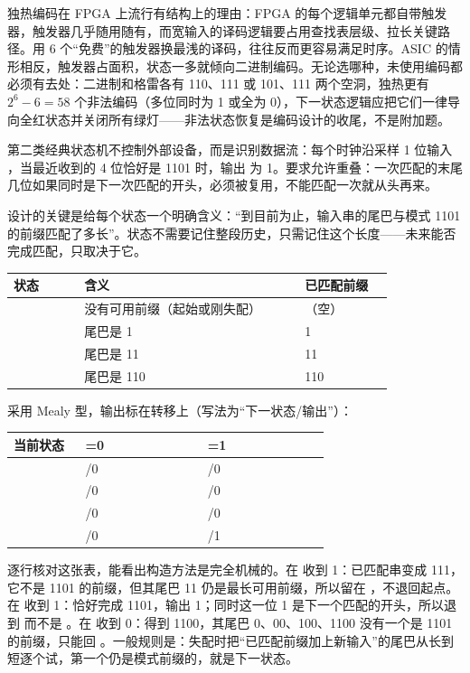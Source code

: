 独热编码在 FPGA 上流行有结构上的理由：FPGA 的每个逻辑单元都自带触发器，触发器几乎随用随有，而宽输入的译码逻辑要占用查找表层级、拉长关键路径。用 6 个“免费”的触发器换最浅的译码，往往反而更容易满足时序。ASIC 的情形相反，触发器占面积，状态一多就倾向二进制编码。无论选哪种，未使用编码都必须有去处：二进制和格雷各有 110、111 或 101、111 两个空洞，独热更有 $2^6-6=58$ 个非法编码（多位同时为 1 或全为 0），下一状态逻辑应把它们一律导向全红状态并关闭所有绿灯——非法状态恢复是编码设计的收尾，不是附加题。


第二类经典状态机不控制外部设备，而是识别数据流：每个时钟沿采样 1 位输入 ，当最近收到的 4 位恰好是 1101 时，输出  为 1。要求允许重叠：一次匹配的末尾几位如果同时是下一次匹配的开头，必须被复用，不能匹配一次就从头再来。

设计的关键是给每个状态一个明确含义：“到目前为止，输入串的尾巴与模式 1101 的前缀匹配了多长”。状态不需要记住整段历史，只需记住这个长度——未来能否完成匹配，只取决于它。

\begin{longtable}{L{0.16\linewidth}L{0.5\linewidth}L{0.2\linewidth}}
\toprule
状态 & 含义 & 已匹配前缀 \\
\midrule
{} & 没有可用前缀（起始或刚失配） & （空） \\\tablerowrule
{} & 尾巴是 1 & 1 \\\tablerowrule
{} & 尾巴是 11 & 11 \\\tablerowrule
{} & 尾巴是 110 & 110 \\
\bottomrule
\end{longtable}

采用 Mealy 型，输出标在转移上（写法为“下一状态/输出”）：

\begin{longtable}{L{0.2\linewidth}L{0.34\linewidth}L{0.34\linewidth}}
\toprule
当前状态 & =0 & =1 \\
\midrule
{} & /0 & /0 \\\tablerowrule
{} & /0 & /0 \\\tablerowrule
{} & /0 & /0 \\\tablerowrule
{} & /0 & /1 \\
\bottomrule
\end{longtable}

逐行核对这张表，能看出构造方法是完全机械的。在  收到 1：已匹配串变成 111，它不是 1101 的前缀，但其尾巴 11 仍是最长可用前缀，所以留在 ，不退回起点。在  收到 1：恰好完成 1101，输出 1；同时这一位 1 是下一个匹配的开头，所以退到  而不是 。在  收到 0：得到 1100，其尾巴 0、00、100、1100 没有一个是 1101 的前缀，只能回 。一般规则是：失配时把“已匹配前缀加上新输入”的尾巴从长到短逐个试，第一个仍是模式前缀的，就是下一状态。

